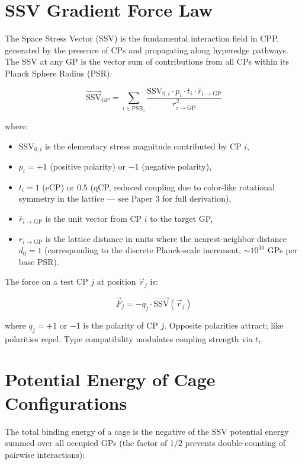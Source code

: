 \documentclass[11pt]{article}
\begin{document}
\section{SSV Gradient Force Law}

The Space Stress Vector (SSV) is the fundamental interaction field in CPP, generated by the presence of CPs and propagating along hyperedge pathways. The SSV at any GP is the vector sum of contributions from all CPs within its Planck Sphere Radius (PSR):

\begin{equation}
\vec{\text{SSV}}_{\text{GP}} = \sum_{i \in \text{PSR}_i} \frac{\text{SSV}_{0,i} \cdot p_i \cdot t_i \cdot \hat{r}_{i \to \text{GP}}}{r_{i \to \text{GP}}^2}
\label{eq:ssv_field}
\end{equation}

where:
\begin{itemize}
    \item $\text{SSV}_{0,i}$ is the elementary stress magnitude contributed by CP $i$,
    \item $p_i = +1$ (positive polarity) or $-1$ (negative polarity),
    \item $t_i = 1$ (eCP) or $0.5$ (qCP, reduced coupling due to color-like rotational symmetry in the lattice — see Paper 3 for full derivation),
    \item $\hat{r}_{i \to \text{GP}}$ is the unit vector from CP $i$ to the target GP,
    \item $r_{i \to \text{GP}}$ is the lattice distance in units where the nearest-neighbor distance $d_0 = 1$ (corresponding to the discrete Planck-scale increment, $\sim 10^{30}$ GPs per base PSR).
\end{itemize}

The force on a test CP $j$ at position $\vec{r}_j$ is:

\begin{equation}
\vec{F}_j = -q_j \cdot \vec{\text{SSV}}(\vec{r}_j)
\label{eq:force_law}
\end{equation}

where $q_j = +1$ or $-1$ is the polarity of CP $j$. Opposite polarities attract; like polarities repel. Type compatibility modulates coupling strength via $t_i$.

\section{Potential Energy of Cage Configurations}

The total binding energy of a cage is the negative of the SSV potential energy summed over all occupied GPs (the factor of 1/2 prevents double-counting of pairwise interactions):
\end{document}
